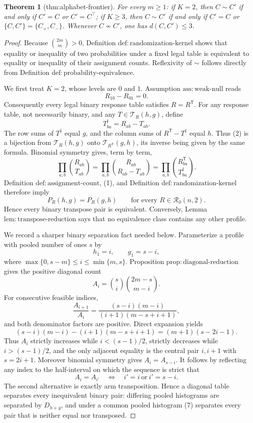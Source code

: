 \documentclass{article}
\newtheorem{theorem}{Theorem}
\begin{document}
\begin{theorem}[thm:alphabet-frontier]\label{thm:alphabet-frontier}
For every \(m\geq1\): if \(K=2\), then \(C\sim C'\) if and only if \(C'=C\) or \(C'=C^\top\); if \(K\geq3\), then \(C\sim C'\) if and only if \(C'=C\) or \(\{C,C'\}=\{C_+,C_-\}\). Whenever \(C\not\sim C'\), one has \(d(C,C')\leq3\).
\end{theorem}
\begin{proof}
Because \(\binom{2m}{m}>0\), Definition \(\mathrm{def{:}randomization\text{-}kernel}\) shows that equality or inequality of two probabilities under a fixed legal table is equivalent to equality or inequality of their assignment counts. Reflexivity of \(\sim\) follows directly from Definition \(\mathrm{def{:}probability\text{-}equivalence}\).

We first treat \(K=2\), whose levels are \(0\) and \(1\). Assumption \(\mathrm{ass{:}weak\text{-}null}\) reads
\[
 R_{10}-R_{01}=0.
 \tag{1}
\]
Consequently every legal binary response table satisfies \(R=R^{\mathsf T}\). For any response table, not necessarily binary, and any \(T\in\mathcal T_R(h,g)\), define
\[
 T^\dagger_{ba}=R_{ab}-T_{ab}.
 \tag{2}
\]
The row sums of \(T^\dagger\) equal \(g\), and the column sums of \(R^{\mathsf T}-T^\dagger\) equal \(h\). Thus (2) is a bijection from \(\mathcal T_R(h,g)\) onto \(\mathcal T_{R^{\mathsf T}}(g,h)\), its inverse being given by the same formula. Binomial symmetry gives, term by term,
\[
 \prod_{a,b}\binom{R_{ab}}{T_{ab}}
 =\prod_{a,b}\binom{R_{ab}}{R_{ab}-T_{ab}}
 =\prod_{a,b}\binom{R^{\mathsf T}_{ba}}{T^\dagger_{ba}}.
\]
Definition \(\mathrm{def{:}assignment\text{-}count}\), (1), and Definition \(\mathrm{def{:}randomization\text{-}kernel}\) therefore imply
\[
 P_R(h,g)=P_R(g,h)
 \qquad\text{for every }R\in\mathcal R_0(n,2).
 \tag{3}
\]
Hence every binary transpose pair is equivalent. Conversely, Lemma \(\mathrm{lem{:}transpose\text{-}reduction}\) says that no equivalence class contains any other profile.

We record a sharper binary separation fact needed below. Parameterize a profile with pooled number of ones \(s\) by
\[
 h_1=i,\qquad g_1=s-i,
\]
where \(\max\{0,s-m\}\leq i\leq\min\{m,s\}\). Proposition \(\mathrm{prop{:}diagonal\text{-}reduction}\) gives the positive diagonal count
\[
 A_i=\binom{s}{i}\binom{2m-s}{m-i}.
 \tag{4}
\]
For consecutive feasible indices,
\[
 \frac{A_{i+1}}{A_i}
 =\frac{(s-i)(m-i)}{(i+1)(m-s+i+1)},
 \tag{5}
\]
and both denominator factors are positive. Direct expansion yields
\[
 (s-i)(m-i)-(i+1)(m-s+i+1)
 =(m+1)(s-2i-1).
 \tag{6}
\]
Thus \(A_i\) strictly increases while \(i<(s-1)/2\), strictly decreases while \(i>(s-1)/2\), and the only adjacent equality is the central pair \(i,i+1\) with \(s=2i+1\). Moreover binomial symmetry gives \(A_i=A_{s-i}\). It follows by reflecting any index to the half-interval on which the sequence is strict that
\[
 A_i=A_{i'}\quad\Longleftrightarrow\quad i'=i\ \text{or}\ i'=s-i.
 \tag{7}
\]
The second alternative is exactly arm transposition. Hence a diagonal table separates every inequivalent binary pair: differing pooled histograms are separated by \(D_{h+g}\), and under a common pooled histogram (7) separates every pair that is neither equal nor transposed.


\end{proof}
\end{document}
